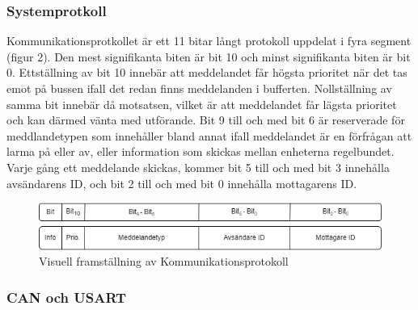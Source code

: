 \documentclass{article}
\begin{document}
\subsubsection{Systemprotkoll}
Kommunikationsprotkollet är ett 11 bitar långt protokoll uppdelat i fyra segment (figur 2).
Den mest signifikanta biten är bit 10 och minst signifikanta biten är bit 0. 
Ettställning av bit 10 innebär att meddelandet får högsta prioritet när det tas emot på bussen ifall det redan finns meddelanden i bufferten.
Nollställning av samma bit innebär då motsatsen, vilket är att meddelandet får lägsta prioritet och kan därmed vänta med utförande. 
Bit 9 till och med bit 6 är reserverade för meddlandetypen som innehåller bland annat ifall meddelandet är en förfrågan att larma på eller av, eller information som skickas mellan enheterna regelbundet. 
Varje gång ett meddelande skickas, kommer bit 5 till och med bit 3 innehålla avsändarens ID, och bit 2 till och med bit 0 innehålla mottagarens ID.

\begin{figure}[h]
    \centering
    \includegraphics[scale=0.5]{Projektrapport/protokoll.png}
    \caption {Visuell framställning av Kommunikationsprotokoll}
    \label{fig:drawing}
\end{figure}

\subsubsection{CAN och USART}
\end{document}
